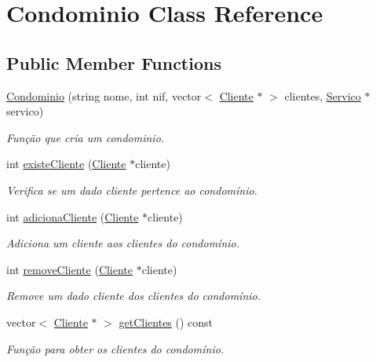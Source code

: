 \hypertarget{class_condominio}{}\section{Condominio Class Reference}
\label{class_condominio}
\subsection*{Public Member Functions}
\begin{DoxyCompactItemize}
\item 
\hyperlink{class_condominio_a73d20c28b4b08007af711d30626b38bb}{Condominio} (string nome, int nif, vector$<$ \hyperlink{class_cliente}{Cliente} $\ast$ $>$ clientes, \hyperlink{class_servico}{Servico} $\ast$servico)
\begin{DoxyCompactList}\small\item\em Função que cria um condominio. \end{DoxyCompactList}\item 
int \hyperlink{class_condominio_a08e2bf58344131ff357f2f7ed62a56fb}{existe\+Cliente} (\hyperlink{class_cliente}{Cliente} $\ast$cliente)
\begin{DoxyCompactList}\small\item\em Verifica se um dado cliente pertence ao condomínio. \end{DoxyCompactList}\item 
int \hyperlink{class_condominio_ae27a8bd9f2e1ad20b18dd34b4bd997d6}{adiciona\+Cliente} (\hyperlink{class_cliente}{Cliente} $\ast$cliente)
\begin{DoxyCompactList}\small\item\em Adiciona um cliente aos clientes do condomínio. \end{DoxyCompactList}\item 
int \hyperlink{class_condominio_ac62185f435dd9c3538a795aa7908beac}{remove\+Cliente} (\hyperlink{class_cliente}{Cliente} $\ast$cliente)
\begin{DoxyCompactList}\small\item\em Remove um dado cliente dos clientes do condomínio. \end{DoxyCompactList}\item 
vector$<$ \hyperlink{class_cliente}{Cliente} $\ast$ $>$ \hyperlink{class_condominio_a6a9100e8a8a48847785f4c4b108ab8db}{get\+Clientes} () const 
\begin{DoxyCompactList}\small\item\em Função para obter os clientes do condomínio. \end{DoxyCompactList}\item 

\end{DoxyCompactItemize}
